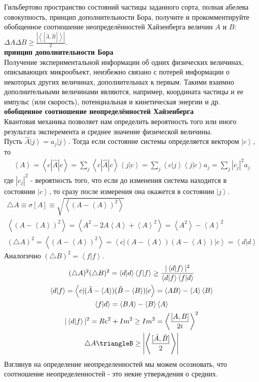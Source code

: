 \documentclass[__main__.tex]{subfiles}
\begin{document}
Гильбертово пространство состояний частицы заданного сорта, полная абелева совокупность, принцип дополнительности Бора, получите и прокомментируйте обобщенное соотношение неопределённостей Хайзенберга величин $A$ и $B$: $\Delta{A}\Delta{B}\ge\frac{\left|\left<\left[\hat{A},\hat{B}\right]\right>\right|}{2}$.\\ 
\textbf{принцип дополнительности Бора}\\
Получение экспериментальной информации об одних физических величинах, описывающих микрообъект, неизбежно связано с потерей информации о некоторых других величинах, дополнительных к первым. Такими взаимно дополнительными величинами являются, например, координата частицы и ее импульс (или скорость), потенциальная и кинетическая энергии и др.
\textbf{обобщенное соотношение неопределённостей Хайзенберга}\\
Квантовая механика позволяет нам определить вероятность того или иного результата эксперемента и среднее значение физической величины.\\
Пусть $\hat{A}\left|j\right> = a_j \left|j\right>$. Тогда если состояние системы определяется вектором $\left|c\right>$, то\\
\begin{gather}
\left<A\right> = \left<c|\hat{A}|c\right> = \sum_j \left<c|\hat{A}|c\right>\left<j|c\right> = \sum_j \left<c|j\right>\left<j|c\right>a_j = \sum_j |c_j|^2 a_j
\end{gather}
где $|c_j|^2$ - вероятность того, что если до изменения система находится в состоянии $\left|c\right>$, то сразу после измерения она окажется в состоянии $\left|j\right>$.\\
\begin{gather}
\triangle A \equiv \sigma[A] \equiv \sqrt{\left<(A-\left<A\right>)^2\right>}\\
\left<(A-\left<A\right>)^2\right> = \left<A^2-2A\left<A\right>+\left<A\right>^2\right> = \left<A^2\right> - \left<A\right>^2\\
(\triangle A)^2 = \left<(A-\left<A\right>)^2\right> = \left< c|(A-\left<A\right>)(A-\left<A\right>)|c\right> = \left<d|d\right>
\end{gather}
Аналогично $(\triangle B)^2 = \left<f|f\right>$.\\
\begin{gather}
(\triangle A)^2(\triangle B)^2 = \left<d|d\right>\left<f|f\right> \geq \frac{|\left<d|f\right>|^2}{\left<d|f\right>\left<f|d\right>}\\
\left<d|f\right> = \left<c|(\hat{A}-\left<A\right>)(\hat{B} - \left<B\right>)|c\right> = \left<AB\right> - \left< A\right> \left< B\right>\\
\left<f|d\right> = \left<BA\right> - \left<B\right>\left<A\right>\\
|\left<d|f\right>|^2 = Re^2+Im^2 \geq Im^2 = \left<\frac{[A,B]}{2i}\right>^2\\
\triangle A\triangleB \geq \left|\left<\frac{[\hat{A},\hat{B}]}{2}\right>\right|
\end{gather}
Взглянув на определение неопределенностей мы можем осозновать, что соотношение неопределенностей - это некие утверждения о средних.\\
\end{document}
